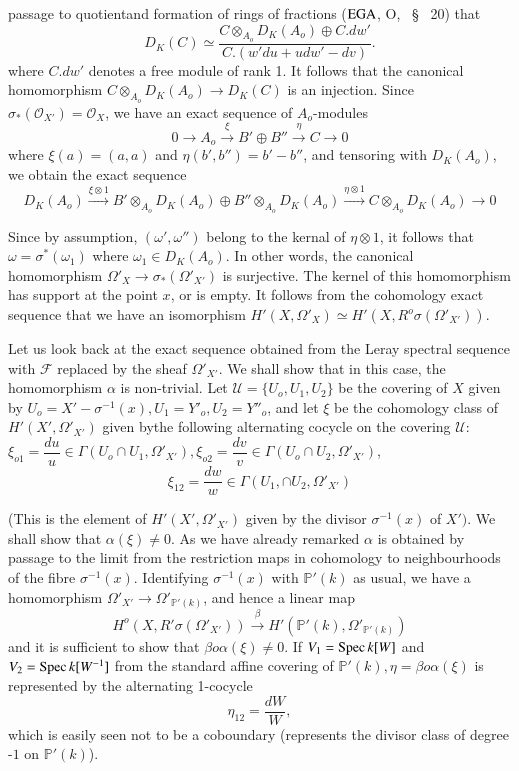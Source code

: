 passage to quotient\pageoriginale  and formation of rings of fractions
($\operatorname{EGA}$, O,~ \S~ 20) that   
$$
D_K(C) \simeq \frac{C \otimes_{A_o} D_K (A_o) \oplus C. dw'}{C.(w' du + u
  dw' - dv)}. 
$$
where $C.dw'$ denotes a free module of rank 1. It follows that the
canonical homomorphism $C \otimes_{A_o} D_K(A_o) \to D_K(C)$ is an
injection. Since $\sigma _* (\mathscr{O}_{X'}) = \mathscr{O}_X$, we
have an exact sequence of $A_o$-modules  
$$ 
0 \to A_o \xrightarrow{\xi} B' \oplus B'' \xrightarrow{\eta} C \to 0
$$
where $\xi (a) = (a, a)$ and $\eta (b', b'') = b' - b''$, and
tensoring with $D_K(A_o)$, we obtain the exact sequence 
$$
D_K(A_o) \xrightarrow{\xi \otimes 1} B' \otimes_{A_o} D_K(A_o) \oplus
B'' \otimes_{A_o} D_K(A_o) \xrightarrow {\eta \otimes 1} C
\otimes_{A_o} D_K(A_o) \to 0 
$$

Since by assumption, $(\omega', \omega'')$ belong to the kernal of
$\eta \otimes 1$, it follows that $\omega = \sigma^* (\omega_1)$ where
$\omega_1 \in D_K(A_o)$. In other words, the canonical homomorphism
$\Omega'_X \to \sigma_* (\Omega'_{X'})$ is surjective. The kernel of
this homomorphism has support at the point $x$, or is empty. It
follows from the cohomology exact sequence that we have an isomorphism
$H'(X, \Omega'_X) \simeq H'(X, R^o \sigma (\Omega'_{X'}))$. 

Let us look back at the exact sequence obtained from the Leray
spectral sequence with $\mathscr{F}$ replaced by the sheaf
$\Omega'_{X'}$. We shall show that in this case, the homomorphism
$\alpha $ is non-trivial. Let $\mathcal{U} = \{U_o, U_1, U_2\}$ be the
covering of $X$ given by $U_o = X' - \sigma^{-1}(x), U_1 = Y'_o,
U_2 = Y''_o$,  and let $\xi$ be the cohomology class of $H'(X',
\Omega'_{X'})$ given by\pageoriginale  the following alternating cocycle on the
covering $\mathcal{U} : $ $\xi_{o1} = \dfrac{du}{u} \in \Gamma (U_o
\cap U_1, \Omega'_{X'}), \xi_{o2} = \dfrac{dv}{v} \in \Gamma(U_o
\cap U_2, \Omega'_{X'})$, 
$$
\xi_{12} = \frac{dw}{w} \in \Gamma (U_1, \cap U_2, \Omega'_{X'})
$$

(This is the element of $H'(X', \Omega'_{X'})$ given by the divisor
$\sigma^{-1} (x)$ of $X')$. We shall show that $\alpha (\xi) \neq
0$. As we have already remarked $\alpha$ is obtained by passage to the
limit from the restriction maps in cohomology to neighbourhoods of the
fibre $\sigma^{-1}(x)$. Identifying $\sigma^{-1}(x)$ with
$\mathbb{P}'(k)$ as usual, we have a homomorphism $\Omega'_{X'}\to
\Omega'_{\mathbb{P'}(k)}$, and hence a linear map 
$$ 
H^{o}(X, R' \sigma (\Omega'_{X'})) \xrightarrow{\beta} H'
(\mathbb{P'}(k), \Omega'_{\mathbb{P}'(k)}) 
$$
and it is sufficient to show that $\beta o \alpha (\xi ) \neq 0$. If
$V_1 = \operatorname{Spec} k[W]$ and $V_2 = \operatorname{Spec} k[W^{-1}]$ from the standard
affine covering of $\mathbb{P}' (k), \eta = \beta o \alpha (\xi)$ is
represented by the alternating 1-cocycle 
$$
\eta_{12} = \frac{dW}{W},
$$
which is easily seen not to be a coboundary (represents the divisor
class of degree -$1$ on $\mathbb{P}'(k)$). 

